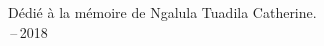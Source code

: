 
\thispagestyle{empty}


\vspace*{3cm}

\begin{center}
Dédié à la mémoire de Ngalula Tuadila Catherine. \\ \,--\,2018
\end{center}